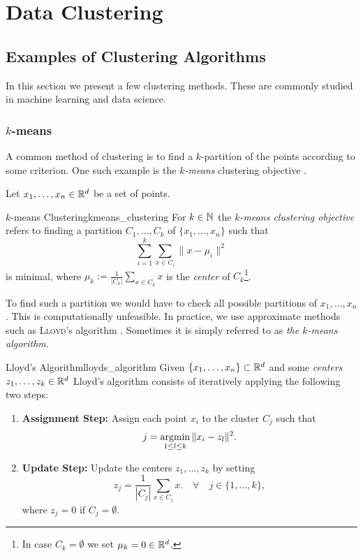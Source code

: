 \chapter{Data Clustering}
\label{chapter__dataclustering}

\section{Examples of Clustering Algorithms}
In this section we present a few clustering methods. These are commonly studied in machine learning and data science.

\subsection{$k$-means}
A common method of clustering is to find a $k$-partition of the points according to some criterion.
One such example is the \emph{$k$-means} clustering objective \cite[Sec.~3.1]{Scitovski2021}.

Let $x_1, \dots, x_n \in \mathbb R^d$ be a set of points.

\begin{definition}{$k$-means Clustering}{kmeans_clustering}
For $k \in \mathbb N$ the \emph{$k$-means clustering objective} refers to finding a partition $C_1, \dots, C_k$ of $\{x_1, \dots, x_n\}$ such that
\begin{equation*}
\label{eq:kmean_optimization}
    \sum_{i = 1}^k \sum_{x \in C_i} \|x - \mu_i\|^2
\end{equation*}
is minimal, where $\mu_k := \frac{1}{|C_k|}\sum_{x \in C_k} x$ is the \emph{center} of $C_k$\footnote{In case $C_k = \emptyset$ we set $\mu_k = 0 \in \mathbb R^d$.}.
\end{definition}
To find such a partition we would have to check all possible partitions of $x_1, \dots, x_n$. This is computationally unfeasible. In practice, we use approximate methods such as \textsc{Lloyd}'s algorithm \cite[Sec.~3.1.2]{Scitovski2021}.
Sometimes it is simply referred to as \emph{the $k$-means algorithm}.

\begin{definition}{Lloyd's Algorithm}{lloyds_algorithm}
Given $\{x_1, \dots, x_n\} \subset \mathbb R^d$ and some \emph{centers} $z_1, \dots, z_k \in \mathbb R^d$
Lloyd's algorithm consists of iteratively applying the following two steps:

\begin{enumerate}
    \item \textbf{Assignment Step:} Assign each point $x_i$ to the cluster $C_j$ such that
    $$
    j = \operatorname*{argmin}_{1 \leq l \leq k} \|x_i - z_l\|^2.
    $$

    \item \textbf{Update Step:} Update the centers $z_1, \dots, z_k$ by setting
    $$
    z_j = \frac{1}{|C_j|}\sum_{x \in C_j} x. \quad \forall \quad j \in \{1, \dots, k\},
    $$
    where $z_j = 0$ if $C_j = \emptyset$. 
\end{enumerate}
\end{definition}

